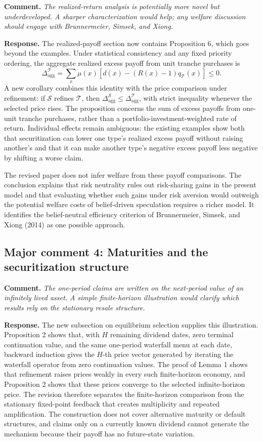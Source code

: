\documentclass[11pt]{article}
\newcommand{\commenttext}[1]{\par\noindent\textbf{Comment.} \textit{#1}\par}
\newcommand{\response}[1]{\par\noindent\textbf{Response.} #1\par}
\begin{document}
\commenttext{The realized-return analysis is potentially more novel but underdeveloped. A sharper characterization would help; any welfare discussion should engage with Brunnermeier, Simsek, and Xiong.}

\response{The realized-payoff section now contains Proposition 6, which goes beyond the examples. Under statistical consistency and any fixed priority ordering, the aggregate realized excess payoff from unit tranche purchases is
\[
\Delta_{\mathrm{agg}}^{\mathcal T}
=\sum_x\mu(x)\left[d(x)-(R(x)-1)q_{\mathcal T}(x)\right]\leq0.
\]
A new corollary combines this identity with the price comparison under refinement: if $\mathcal S$ refines $\mathcal T$, then $\Delta_{\mathrm{agg}}^{\mathcal S}\leq\Delta_{\mathrm{agg}}^{\mathcal T}$, with strict inequality whenever the selected price rises. The proposition concerns the sum of excess payoffs from one-unit tranche purchases, rather than a portfolio-investment-weighted rate of return. Individual effects remain ambiguous: the existing examples show both that securitization can lower one type's realized excess payoff without raising another's and that it can make another type's negative excess payoff less negative by shifting a worse claim.

The revised paper does not infer welfare from these payoff comparisons. The conclusion explains that risk neutrality rules out risk-sharing gains in the present model and that evaluating whether such gains under risk aversion would outweigh the potential welfare costs of belief-driven speculation requires a richer model. It identifies the belief-neutral efficiency criterion of Brunnermeier, Simsek, and Xiong (2014) as one possible approach.}

\subsection*{Major comment 4: Maturities and the securitization structure}

\commenttext{The one-period claims are written on the next-period value of an infinitely lived asset. A simple finite-horizon illustration would clarify which results rely on the stationary resale structure.}

\response{The new subsection on equilibrium selection supplies this illustration. Proposition 2 shows that, with $H$ remaining dividend dates, zero terminal continuation value, and the same one-period waterfall menu at each date, backward induction gives the $H$-th price vector generated by iterating the waterfall operator from zero continuation values. The proof of Lemma 1 shows that refinement raises prices weakly in every such finite-horizon economy, and Proposition 2 shows that these prices converge to the selected infinite-horizon price. The revision therefore separates the finite-horizon comparison from the stationary fixed-point feedback that creates multiplicity and repeated amplification. The construction does not cover alternative maturity or default structures, and claims only on a currently known dividend cannot generate the mechanism because their payoff has no future-state variation.}
\end{document}
